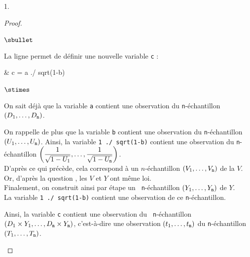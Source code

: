 \documentclass[11pt]{article}%
\begin{document}
\begin{noliste}{1.}
\begin{proof}
\begin{noliste}{$\sbullet$}
      
      \newpage
      
      
    \item La ligne  permet de définir une nouvelle variable
      {\tt c} :
      \begin{scilabC}{3}
        & c = a ./ sqrt(1-b)
      \end{scilabC}
      \begin{noliste}{$\stimes$}
      \item On sait déjà que la variable {\tt a} contient
        une observation du {\tt n}-échantillon $(D_1, \ldots, D_{\tt n})$.
        
      \item On rappelle de plus que la variable {\tt b} contient
        une observation du {\tt n}-échantillon $(U_1, \ldots, U_{\tt
          n})$. Ainsi, la variable {\tt 1 ./ sqrt(1-b)} contient une
        observation du {\tt n}-échantillon
        $\left(\dfrac{1}{\sqrt{1-U_1}}, \ldots,
          \dfrac{1}{\sqrt{1-U_{\tt n}}}\right)$.\\[.1cm]
        D'après ce qui précède, cela correspond à un $n$-échantillon
        $(V_1, \ldots, V_{\tt n})$ de la \var $V$.\\
        Or, d'après la question , les \var $V$ et $Y$ ont
        même loi.\\
        Finalement, on construit ainsi par étape un {\tt
          n}-échantillon $(Y_1, \ldots, Y_{\tt n})$ de $Y$.\\
        La variable {\tt 1 ./ sqrt(1-b)} contient
        une observation de ce {\tt n}-échantillon.
      \end{noliste}
      Ainsi, la variable {\tt c} contient une observation du {\tt
        n}-échantillon $(D_1 \times Y_1, \ldots, D_{\tt n} \times
      Y_{\tt n})$, c'est-à-dire une observation $(t_1, \ldots, t_{\tt
        n})$ du {\tt n}-échantillon $(T_1, \ldots, T_{\tt n})$.
      
      
      
      

\end{noliste}
\end{proof}
\end{noliste}
\end{document}
